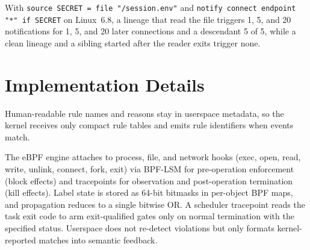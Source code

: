 With \texttt{source SECRET = file "/session.env"} and \texttt{notify connect endpoint "*" if SECRET} on Linux~6.8, a lineage that read the file triggers 1, 5, and 20 notifications for 1, 5, and 20 later connections and a descendant 5 of 5, while a clean lineage and a sibling started after the reader exits trigger none.

\section{Implementation Details}
\label{sec:supp:impl}
Human-readable rule names and reasons stay in userspace metadata, so the kernel receives only compact rule tables and emits rule identifiers when events match.

The eBPF engine attaches to process, file, and network hooks (exec, open, read, write, unlink, connect, fork, exit) via BPF-LSM for pre-operation enforcement (block effects) and tracepoints for observation and post-operation termination (kill effects).
Label state is stored as 64-bit bitmasks in per-object BPF maps, and propagation reduces to a single bitwise OR.
A scheduler tracepoint reads the task exit code to arm exit-qualified gates only on normal termination with the specified status.
Userspace does not re-detect violations but only formats kernel-reported matches into semantic feedback.

